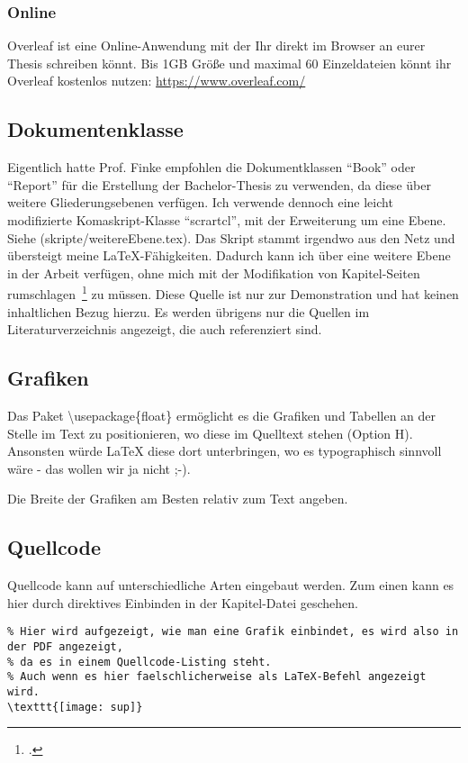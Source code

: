 \subsubsection{Online}
Overleaf ist eine Online-Anwendung mit der Ihr direkt im Browser an eurer Thesis schreiben könnt. Bis 1GB Größe und maximal 60 Einzeldateien könnt ihr Overleaf kostenlos nutzen: \url{https://www.overleaf.com/}


\subsection{Dokumentenklasse}
Eigentlich hatte Prof. Finke empfohlen die Dokumentklassen \enquote{Book} oder \enquote{Report} für die Erstellung der Bachelor-Thesis zu verwenden, da diese über weitere Gliederungsebenen verfügen. Ich verwende dennoch eine leicht modifizierte Komaskript-Klasse \enquote{scrartcl}, mit der Erweiterung um eine Ebene. Siehe (skripte/weitereEbene.tex). Das Skript stammt irgendwo aus den Netz und übersteigt meine \LaTeX{}-Fähigkeiten. Dadurch kann ich über eine weitere Ebene in der Arbeit verfügen, ohne mich mit der Modifikation von Kapitel-Seiten rumschlagen~\footcite[Vgl. ][S. 5]{Tanenbaum.2003} zu müssen. Diese Quelle ist nur zur Demonstration und hat keinen inhaltlichen Bezug hierzu. Es werden übrigens nur die Quellen im Literaturverzeichnis angezeigt, die auch referenziert sind.


\subsection{Grafiken}
Das Paket \textbackslash usepackage\{float\} ermöglicht es die Grafiken und Tabellen an der Stelle im Text zu positionieren, wo diese im Quelltext stehen (Option H). Ansonsten würde \LaTeX{} diese dort unterbringen, wo es typographisch sinnvoll wäre - das wollen wir ja nicht ;-).

Die Breite der Grafiken am Besten relativ zum Text angeben.

\subsection{Quellcode}
Quellcode kann auf unterschiedliche Arten eingebaut werden.
Zum einen kann es hier durch direktives Einbinden in der Kapitel-Datei geschehen.
\begin{lstlisting}
% Hier wird aufgezeigt, wie man eine Grafik einbindet, es wird also in der PDF angezeigt,
% da es in einem Quellcode-Listing steht.
% Auch wenn es hier faelschlicherweise als LaTeX-Befehl angezeigt wird.
\texttt{[image: sup]}
\end{lstlisting}

